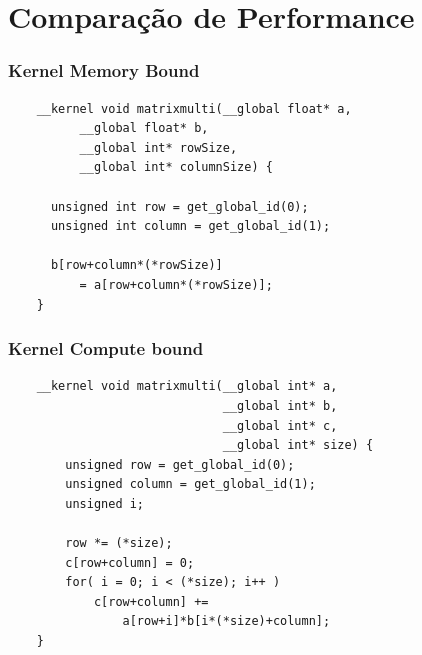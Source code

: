 \documentclass[brazil]{beamer}
\begin{document}
\section{Comparação de Performance}



\begin{frame}[fragile]
  \frametitle{Kernel Memory Bound}
  \begin{lstlisting}
    __kernel void matrixmulti(__global float* a, 
          __global float* b, 
          __global int* rowSize, 
          __global int* columnSize) {
          
      unsigned int row = get_global_id(0);
      unsigned int column = get_global_id(1);
      
      b[row+column*(*rowSize)] 
          = a[row+column*(*rowSize)];
    }
  \end{lstlisting}
\end{frame}


\begin{frame}[fragile]
  \frametitle{Kernel Compute bound}
  \begin{lstlisting}
    __kernel void matrixmulti(__global int* a, 
                              __global int* b, 
                              __global int* c, 
                              __global int* size) {
        unsigned row = get_global_id(0);
        unsigned column = get_global_id(1);
        unsigned i;
        
        row *= (*size);
        c[row+column] = 0;
        for( i = 0; i < (*size); i++ ) 
            c[row+column] += 
                a[row+i]*b[i*(*size)+column];
    }
  \end{lstlisting}
\end{frame}
\end{document}
